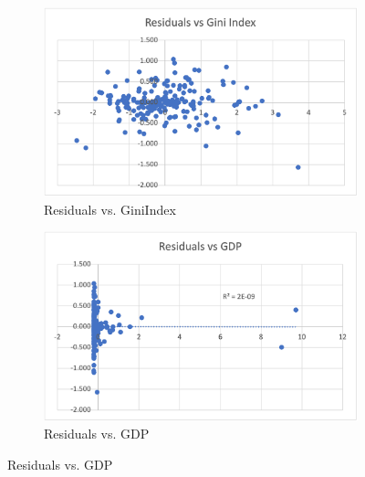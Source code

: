 \documentclass{article}
\begin{document}
\begin{appendices}
\begin{figure}[H]
     \centering
     \begin{subfigure}[b]{0.475\textwidth}
         \centering
         \includegraphics[width=\textwidth]{Images/resgini.png}
         \caption{Residuals vs. GiniIndex}
         \label{fig:resgini}
     \end{subfigure}
     \hfill
     \begin{subfigure}[b]{0.475\textwidth}
         \centering
         \includegraphics[width=\textwidth]{Images/resgdp.png}
         \caption{Residuals vs. GDP}
         \label{fig:resgdp}
     \end{subfigure}
    \caption{Residuals vs. GDP}
    \label{fig:scatterresid1}
\end{figure}


\end{appendices}
\end{document}
